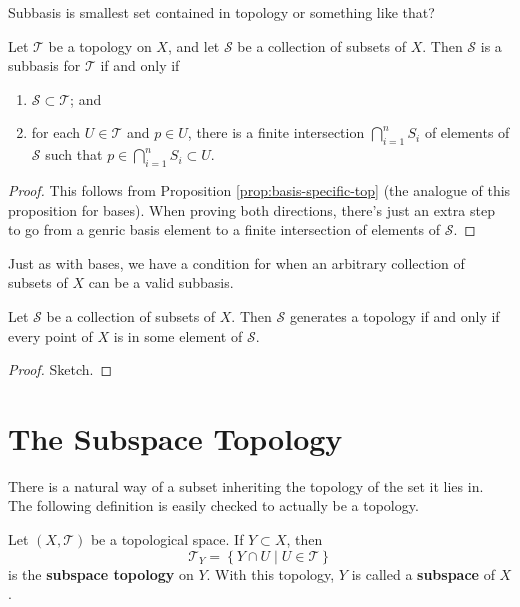 \documentclass[10pt]{report}
\begin{document}
{\color{red}Subbasis is smallest set contained in topology or something like that?}

\begin{prop}
Let $\mathcal{T}$ be a topology on $X$, and let $\mathcal{S}$ be a collection of subsets of $X$. Then $\mathcal{S}$ is a subbasis for $\mathcal{T}$ if and only if
\begin{enumerate}
	\item $\mathcal{S} \subset \mathcal{T}$; and
	\item for each $U \in \mathcal{T}$ and $p \in U$, there is a finite intersection $\bigcap_{i=1}^n S_i$ of elements of $\mathcal{S}$ such that $p \in \bigcap_{i=1}^n S_i \subset U$.
\end{enumerate}
\end{prop}
\begin{proof}
	This follows from Proposition \ref{prop:basis-specific-top} (the analogue of this proposition for bases). When proving both directions, there's just an extra step to go from a genric basis element to a finite intersection of elements of $\mathcal{S}$.
\end{proof}

Just as with bases, we have a condition for when an arbitrary collection of subsets of $X$ can be a valid subbasis.

\begin{prop}
Let $\mathcal{S}$ be a collection of subsets of $X$. Then $\mathcal{S}$ generates a topology if and only if every point of $X$ is in some element of $\mathcal{S}$.
\end{prop}
\begin{proof}
{\color{red}Sketch.}
\end{proof}


\section{The Subspace Topology}

There is a natural way of a subset inheriting the topology of the set it lies in. The following definition is easily checked to actually be a topology.

\begin{defn}
	Let $(X,\mathcal{T})$ be a topological space. If $Y \subset X$, then
	\[
	\mathcal{T}_Y = \left\{ Y \cap U \;|\; U \in \mathcal{T} \right\}
	\] is the \textbf{subspace topology} on $Y$. With this topology, $Y$ is called a \textbf{subspace} of $X$.
\end{defn}
\end{document}

